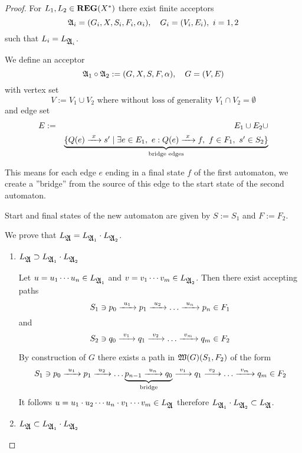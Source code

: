 \begin{proof}
For $L_1, L_2 \in \mbox{{\bf REG}}(X^*)$ there exist finite acceptors
\[ \mbox{$\mathfrak{A}$}_i = (G_i, X, S_i, F_i, \alpha_i),\quad G_i = (V_i, E_i),\ i=1,2 \]
such that $L_i = L_{\mbox{$\mathfrak{A}$}_i}$.

We define an acceptor
\[ \mbox{$\mathfrak{A}$}_1 \circ \mbox{$\mathfrak{A}$}_2 := (G, X, S, F, \alpha),\quad G = (V, E) \]
with vertex set
\[ V := V_1 \cup V_2\text{ where without loss of generality }V_1 \cap V_2 =
\emptyset \]
and edge set
\begin{eqnarray*}
E &:=& E_1 \cup E_2 \cup \\
&& \underbrace{\setof{Q(e) \edge{x} s' \mid \exists e \in E_1,\ e: Q(e) \edge{x}
f,\ f \in F_1,\ s' \in S_2}}_{\text{bridge edges}}
\end{eqnarray*}

This means for each edge $e$ ending in a final state $f$ of the first
automaton, we create a ''bridge'' from the source of this edge to the start
state of the second automaton.

Start and final states of the new automaton are given by $S := S_1$ and $F :=
F_2$.

\begin{center}

\end{center}

We prove that $L_{\mbox{$\mathfrak{A}$}} = L_{\mbox{$\mathfrak{A}$}_1} \cdot L_{\mbox{$\mathfrak{A}$}_2}$.

\begin{enumerate}
  \item $L_{\mbox{$\mathfrak{A}$}} \supset L_{\mbox{$\mathfrak{A}$}_1} \cdot L_{\mbox{$\mathfrak{A}$}_2}$
  
  Let $u = u_1 \cdots u_n \in L_{\mbox{$\mathfrak{A}$}_1}$ and $v = v_1 \cdots v_m \in
  L_{\mbox{$\mathfrak{A}$}_2}$. Then there exist accepting paths
  \[ S_1 \ni p_0 \xrightarrow{\ {u_1}\ } p_1 \xrightarrow{\ {u_2}\ } \ldots \xrightarrow{\ {u_n}\ } p_n \in F_1 \]
  and 
  \[ S_2 \ni q_0 \xrightarrow{\ {v_1}\ } q_1 \xrightarrow{\ {v_2}\ } \ldots \xrightarrow{\ {v_m}\ } q_m \in F_2 \]
  
  By construction of $G$ there exists a path in $\mbox{$\mathfrak{W}({G})$}(S_1, F_2)$ of
  the form
  \[ S_1 \ni p_0 \xrightarrow{\ {u_1}\ } p_1 \xrightarrow{\ {u_2}\ } \ldots \underbrace{p_{n-1} \xrightarrow{\ {u_n}\ }
  q_0}_{\text{bridge}} \xrightarrow{\ {v_1}\ } q_1 \xrightarrow{\ {v_2}\ } \ldots \xrightarrow{\ {v_m}\ } q_m \in F_2
  \]
  It follows $u = u_1 \cdot u_2 \cdots u_n \cdot v_1 \cdots v_m \in L_{\mbox{$\mathfrak{A}$}}$
  therefore $L_{\mbox{$\mathfrak{A}$}_1} \cdot L_{\mbox{$\mathfrak{A}$}_2} \subset L_{\mbox{$\mathfrak{A}$}}$.
  \medskip
  
  \item $L_{\mbox{$\mathfrak{A}$}} \subset L_{\mbox{$\mathfrak{A}$}_1} \cdot L_{\mbox{$\mathfrak{A}$}_2}$
  

\end{enumerate}
\end{proof}
